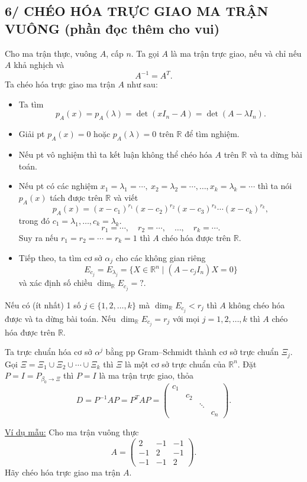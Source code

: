 \documentclass[12pt,a4paper]{article}
\newcommand{\R}{\mathbb{R}}
\begin{document}
\subsection*{6/ CHÉO HÓA TRỰC GIAO MA TRẬN VUÔNG (phần đọc thêm cho vui)}
Cho ma trận thực, vuông $A$, cấp $n$.
Ta gọi $A$ là ma trận trực giao, nếu và chỉ nếu $A$ khả nghịch và
\[
A^{-1}=A^T.
\]
Ta chéo hóa trực giao ma trận $A$ như sau:
\begin{itemize}
\item Ta tìm
\[
p_A(x)=p_A(\lambda)=\det(xI_n-A)=\det(A-\lambda I_n).
\]
\item Giải pt $p_A(x)=0$ hoặc $p_A(\lambda)=0$ trên $\R$ để tìm nghiệm.
\item Nếu pt vô nghiệm thì ta kết luận không thể chéo hóa $A$ trên $\R$ và ta dừng bài toán.
\item Nếu pt có các nghiệm $x_1=\lambda_1=\cdots,\ x_2=\lambda_2=\cdots,\ldots,x_k=\lambda_k=\cdots$ thì ta nói $p_A(x)$ tách được trên $\R$ và viết
\[
p_A(x)=(x-c_1)^{r_1}(x-c_2)^{r_2}(x-c_3)^{r_3}\cdots(x-c_k)^{r_k},
\]
trong đó $c_1=\lambda_1,\ldots,c_k=\lambda_k$.
\[
r_1=\cdots,\quad r_2=\cdots,\quad\ldots,\quad r_k=\cdots.
\]
Suy ra nếu $r_1=r_2=\cdots=r_k=1$ thì $A$ chéo hóa được trên $\R$.
\item Tiếp theo, ta tìm cơ sở $\alpha_j$ cho các không gian riêng
\[
E_{c_j}=E_{\lambda_j}=\{X\in\R^n\mid(A-c_jI_n)X=0\}
\]
và xác định số chiều $\dim_{\R}E_{c_j}=?$.
\end{itemize}
Nếu có (ít nhất) 1 số $j\in\{1,2,\ldots,k\}$ mà $\dim_{\R}E_{c_j}<r_j$ thì $A$ không chéo hóa được và ta dừng bài toán.
Nếu $\dim_{\R}E_{c_j}=r_j$ với mọi $j=1,2,\ldots,k$ thì $A$ chéo hóa được trên $\R$.

Ta trực chuẩn hóa cơ sở $\alpha^j$ bằng pp Gram--Schmidt thành cơ sở trực chuẩn $\Xi_j$.
Gọi $\Xi=\Xi_1\cup\Xi_2\cup\cdots\cup\Xi_k$ thì $\Xi$ là một cơ sở trực chuẩn của $\R^n$.
Đặt $P=I=P_{\beta_0\to\Xi}$ thì $P=I$ là ma trận trực giao, thỏa
\[
D=P^{-1}AP=P^TAP=\begin{pmatrix}
c_1&&\\&c_2&\\&&\ddots\\&&&c_n
\end{pmatrix}.
\]

\underline{Ví dụ mẫu:} Cho ma trận vuông thực
\[
A=\begin{pmatrix}
2&-1&-1\\
-1&2&-1\\
-1&-1&2
\end{pmatrix}.
\]
Hãy chéo hóa trực giao ma trận $A$.
\end{document}
